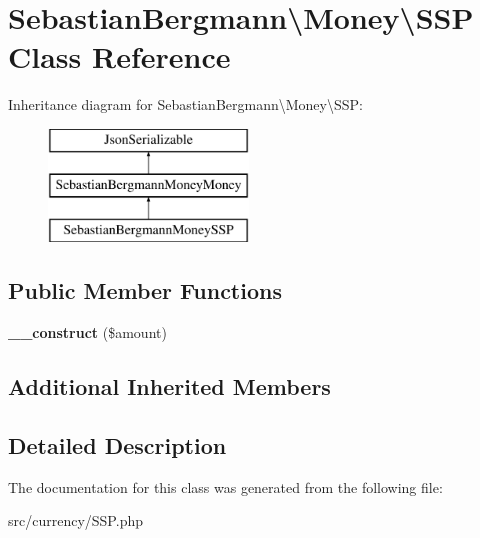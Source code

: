 \hypertarget{classSebastianBergmann_1_1Money_1_1SSP}{}\section{Sebastian\+Bergmann\textbackslash{}Money\textbackslash{}S\+S\+P Class Reference}
\label{classSebastianBergmann_1_1Money_1_1SSP}
Inheritance diagram for Sebastian\+Bergmann\textbackslash{}Money\textbackslash{}S\+S\+P\+:\begin{figure}[H]
\begin{center}
\leavevmode
\includegraphics[height=3.000000cm]{classSebastianBergmann_1_1Money_1_1SSP}
\end{center}
\end{figure}
\subsection*{Public Member Functions}
\begin{DoxyCompactItemize}
\item 
\hypertarget{classSebastianBergmann_1_1Money_1_1SSP_af8000fbe1a14e4a8e751d2854d0267d6}{}{\bfseries \+\_\+\+\_\+construct} (\$amount)\label{classSebastianBergmann_1_1Money_1_1SSP_af8000fbe1a14e4a8e751d2854d0267d6}

\end{DoxyCompactItemize}
\subsection*{Additional Inherited Members}


\subsection{Detailed Description}


The documentation for this class was generated from the following file\+:\begin{DoxyCompactItemize}
\item 
src/currency/S\+S\+P.\+php\end{DoxyCompactItemize}
